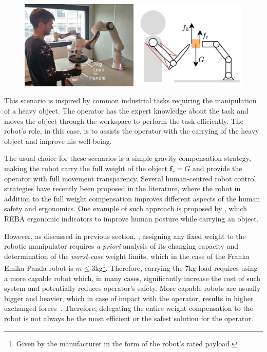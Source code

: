 \begin{figure}[!t]
    \centering
    \includegraphics[width=\linewidth]{Papers/images/exp2_real_schema.jpg}
    \caption{}
    \label{fig:exp2_real_schema}
\end{figure}

This scenario is inspired by common industrial tasks requiring 
the manipulation of a heavy object. The operator has the expert knowledge about the task and moves the object through the workspace to perform the task efficiently. The robot's role, in this case, is to assists the operator with the carrying of the heavy object and improve his well-being.

The usual choice for these scenarios is a simple gravity compensation strategy, making the robot carry the full weight of the object $\bm{f}_r = G$ and provide the operator with full movement transparency. Several human-centred robot control strategies have recently been proposed in the literature, where the robot in addition to the full weight compensation improves different aspects of the human safety and ergonomics. One example of such approach is proposed by \citet{ferraguti2020unified}, which REBA \cite{reba} ergonomic indicators to improve human posture while carrying an object. 

However, as discussed in previous section, , assigning any fixed weight to the robotic manipulator requires \textit{a priori} analysis of its changing capacity and determination of the \textit{worst-case} weight limits, which in the case of the Franka Emika Panda robot is $m\leq3$kg\footnote{Given by the manufacturer in the form of the robot's rated payload.}. Therefore, carrying the 7kg load requires using a more capable robot which, in many cases, significantly increase the cost of such system and potentially reduces operator's safety. More capable robots are usually bigger and heavier, which in case of impact with the operator, results in higher exchanged forces~\cite{smu}.
Therefore, delegating the entire weight compensation to the robot is not always be the most efficient or the safest solution for the operator. 

